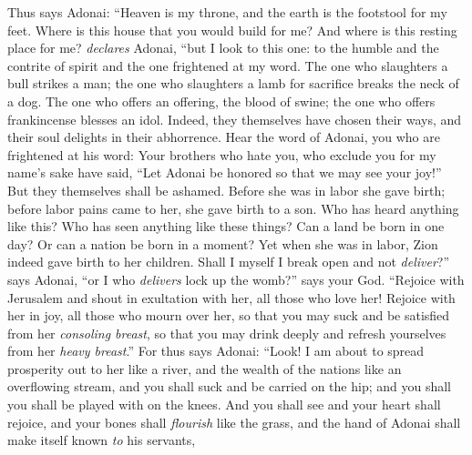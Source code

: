 \begin{biblechapter} %
 Thus says Adonai:
\verse “Heaven is my throne, 
and the earth is the footstool for my feet. 
Where is this house that you would build for me? 
And where is this resting place for me? \textit{declares} Adonai, “but I look to this one:
\verse to the humble and the contrite of spirit 
and the one frightened at my word.
\verse The one who slaughters a bull strikes a man; 
the one who slaughters a lamb for sacrifice breaks the neck of a dog. 
The one who offers an offering, the blood of swine; 
the one who offers frankincense blesses an idol. 
Indeed, they themselves have chosen their ways, 
and their soul delights in their abhorrence.
\verse Hear the word of Adonai, you who are frightened at his word:
\verse Your brothers who hate you, 
who exclude you for my name’s sake have said, 
“Let Adonai be honored so that we may see your joy!” 
But they themselves shall be ashamed.
 Before she was in labor she gave birth; 
before labor pains came to her, she gave birth to a son.
\verse Who has heard anything like this? 
Who has seen anything like these things? 
Can a land be born in one day? 
Or can a nation be born in a moment? Yet when she was in labor, Zion indeed gave birth to her children.
\verse Shall I myself I break open and not \textit{deliver}?” says Adonai, 
“or I who \textit{delivers} lock up the womb?” says your God.
\verse “Rejoice with Jerusalem 
and shout in exultation with her, all those who love her! 
Rejoice with her in joy, all those who mourn over her,
\verse so that you may suck and be satisfied from her \textit{consoling breast}, 
so that you may drink deeply and refresh yourselves from her \textit{heavy breast}.”
\verse For thus says Adonai:
\verse “Look! I am about to spread prosperity out to her like a river, 
and the wealth of the nations like an overflowing stream, 
and you shall suck and be carried on the hip; 
and you shall you shall be played with on the knees.
 And you shall see and your heart shall rejoice, 
and your bones shall \textit{flourish} like the grass, 
and the hand of Adonai shall make itself known \textit{to} his servants, 

\end{biblechapter}
